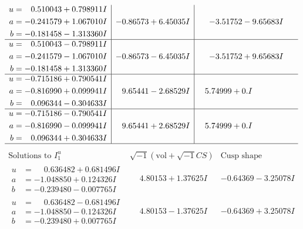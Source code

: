 \documentclass[1p]{elsarticle_modified}
\theoremstyle{definition}
\newcommand{\I}{\sqrt{-1}}
\begin{document}
$$\begin{array}{c|c|c}
\begin{aligned}
u &= \phantom{-}0.510043 + 0.798911 I \\
a &= -0.241579 + 1.067010 I \\
b &= -0.181458 - 1.313360 I\end{aligned}
 & -0.86573 + 6.45035 I & -3.51752 - 9.65683 I \\ \hline\begin{aligned}
u &= \phantom{-}0.510043 - 0.798911 I \\
a &= -0.241579 - 1.067010 I \\
b &= -0.181458 + 1.313360 I\end{aligned}
 & -0.86573 - 6.45035 I & -3.51752 + 9.65683 I \\ \hline\begin{aligned}
u &= -0.715186 + 0.790541 I \\
a &= -0.816990 + 0.099941 I \\
b &= \phantom{-}0.096344 - 0.304633 I\end{aligned}
 & \phantom{-}9.65441 - 2.68529 I & \phantom{-}5.74999 + 0. I\phantom{ +0.000000I} \\ \hline\begin{aligned}
u &= -0.715186 - 0.790541 I \\
a &= -0.816990 - 0.099941 I \\
b &= \phantom{-}0.096344 + 0.304633 I\end{aligned}
 & \phantom{-}9.65441 + 2.68529 I & \phantom{-}5.74999 + 0. I\phantom{ +0.000000I}\\
 \hline 
 \end{array}$$\newpage$$\begin{array}{c|c|c}  
\text{Solutions to }I^u_{1}& \I (\text{vol} + \sqrt{-1}CS) & \text{Cusp shape}\\
 \hline 
\begin{aligned}
u &= \phantom{-}0.636482 + 0.681496 I \\
a &= -1.048850 + 0.124326 I \\
b &= -0.239480 - 0.007765 I\end{aligned}
 & \phantom{-}4.80153 + 1.37625 I & -0.64369 - 3.25078 I \\ \hline\begin{aligned}
u &= \phantom{-}0.636482 - 0.681496 I \\
a &= -1.048850 - 0.124326 I \\
b &= -0.239480 + 0.007765 I\end{aligned}
 & \phantom{-}4.80153 - 1.37625 I & -0.64369 + 3.25078 I \\ \hline\begin{aligned}

\end{aligned}
\end{array}$$
\end{document}
